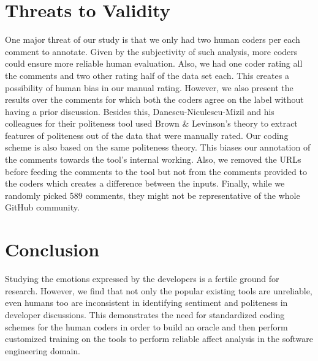\section{Threats to Validity}
One major threat of our study is 
that we only had two human coders 
per each comment to annotate. 
Given by the subjectivity of such analysis, 
more coders could ensure more reliable human evaluation.
Also, we had one coder rating all the comments 
and two other rating half of the data set each.
This creates a possibility of human bias 
in our manual rating.
However, we also present the results over the comments 
for which both the coders agree on the label 
without having a prior discussion.
Besides this, Danescu-Niculescu-Mizil and his colleagues 
for their politeness tool used Brown \& Levinson's theory 
to extract features of politeness out of the data 
that were manually rated. 
Our coding scheme is also based on the same politeness theory. 
This biases our annotation of the comments 
towards the tool's internal working. 
Also, 
we removed the URLs 
before feeding the comments to the tool 
but 
not from the comments provided to the coders 
which creates a difference between the inputs.
Finally, while we randomly picked 589 comments, they might not be representative of the whole GitHub community.

\section{Conclusion}
Studying the emotions expressed by the developers
is a fertile ground for research. 
However, we find that 
not only the popular existing tools are unreliable,
even humans too are inconsistent  
in identifying sentiment and politeness 
in developer discussions.
This demonstrates the need for 
standardized coding schemes 
for the human coders
in order to build an oracle
and then perform customized training 
on the tools
to perform reliable affect analysis
in the software engineering domain. 






